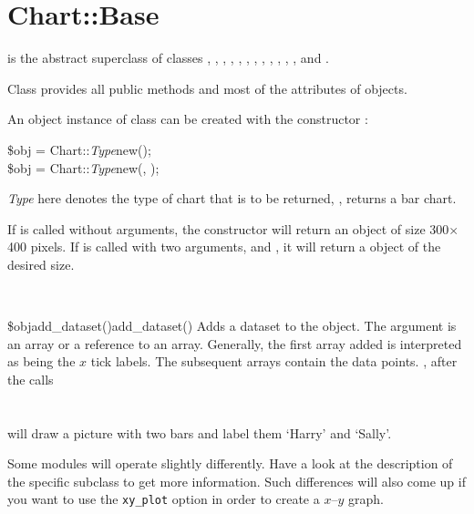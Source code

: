 %
%
\renewcommand{\thisname}{Chart::Base}
\section{\thisname}
\name{\thisname}
\begin{Description}
\thisclass is the abstract superclass of classes ,
, ,
, ,
, ,
, , ,
, , and
.

Class \thisclass provides all public methods and most of the
attributes of \chart objects.
\end{Description}

\begin{Constructor}
An object instance of class  can be created with the
constructor :
\begin{SmallExample}
\$obj = Chart::\textit{Type}\deref new();\\
\$obj = Chart::\textit{Type}\deref new(, );
\end{SmallExample}
\textit{Type} here denotes the type of chart that is to be returned,
\eg,  returns a bar chart.

If  is called without arguments, the constructor will
return an object of size 300\ensuremath{\times}400 pixels. If
 is called with two arguments,  and
, it will return a \chart object of the desired
size.
\end{Constructor}


\Methods\label{methods}\noindent%
\\
\begin{MethDecl}{\$obj\deref add\_dataset()}{add\_dataset()}
Adds a dataset to the object. The argument is an array or a reference to
an array. Generally, the first array added is interpreted as being the
$x$ tick labels. The subsequent arrays contain the data points. \Eg,
after the calls\\
\\
\\
\chart will draw a picture with two bars and label them `Harry' and
`Sally'.

Some modules will operate slightly differently. Have a look at the
description of the specific subclass to get more information. Such
differences will also come up if you want to use the \texttt{xy\_plot}
option in order to create a $x$--$y$ graph.
\end{MethDecl}

